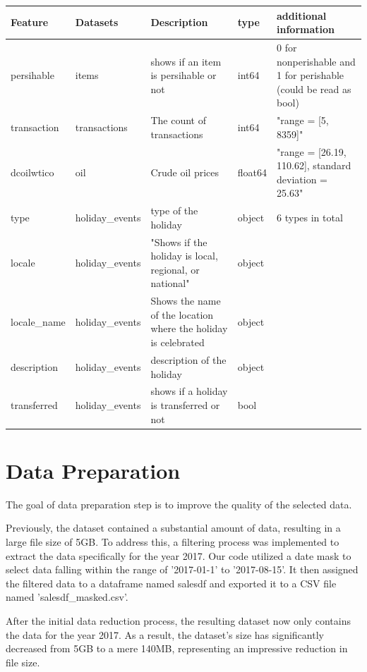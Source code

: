 \begin{table}[p]
	\centering
	\begin{tabular}{|p{2cm}|p{1.9cm}|p{3cm}|p{3cm}|p{2.5cm}|}
		\hline
		\textbf{Feature} & \textbf{Datasets} & \textbf{Description} & \textbf{type} & \textbf{additional information} \\ \hline
		persihable & items & shows if an item is persihable or not & int64 & 0 for nonperishable and 1 for perishable (could be read as bool) \\ \hline
		transaction & transactions & The count of transactions & int64 & "range = [5, 8359]" \\ \hline
		dcoilwtico & oil & Crude oil prices & float64 & "range = [26.19, 110.62], standard deviation = 25.63" \\ \hline
		type & holiday\_events & type of the holiday & object & 6 types in total \\ \hline
		locale & holiday\_events & "Shows if the holiday is local, regional, or national" & object & ~ \\ \hline
		locale\_name & holiday\_events & Shows the name of the location where the holiday is celebrated & object & ~ \\ \hline
		description & holiday\_events & description of the holiday & object & ~ \\ \hline
		transferred & holiday\_events & shows if a holiday is transferred or not & bool & ~ \\ \hline
	\end{tabular}
\end{table}

\section{Data Preparation}

	The goal of data preparation step is to improve the quality of the selected data. 
	
	Previously, the dataset contained a substantial amount of data, resulting in a large file size of 5GB. To address this, a filtering process was implemented to extract the data specifically for the year 2017. Our code utilized a date mask to select data falling within the range of '2017-01-1' to '2017-08-15'. It then assigned the filtered data to a dataframe named salesdf and exported it to a CSV file named 'salesdf\_masked.csv'.
	
	After the initial data reduction process, the resulting dataset now only contains the data for the year 2017. As a result, the dataset's size has significantly decreased from 5GB to a mere 140MB, representing an impressive reduction in file size.
	
